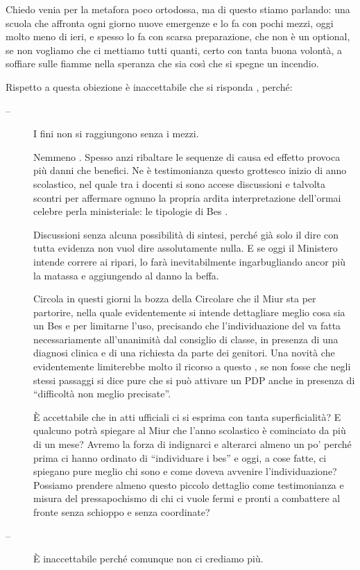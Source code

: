 Chiedo venia per la metafora poco ortodossa, ma di questo stiamo parlando: una scuola che affronta ogni giorno nuove emergenze e lo fa con pochi mezzi, oggi molto meno di ieri, e spesso lo fa con scarsa preparazione, che non è un optional, se non vogliamo che ci mettiamo tutti quanti, certo con tanta buona volontà, a soffiare sulle fiamme nella speranza che sia così che si spegne un incendio.

Rispetto a questa obiezione è inaccettabile che si risponda , perché:
\begin{description}
	\item[--]  I fini non si raggiungono senza i mezzi.
	
	 Nemmeno . Spesso anzi ribaltare le sequenze di causa ed effetto provoca più danni che benefici. Ne è testimonianza questo grottesco inizio di anno scolastico, nel quale tra i docenti si sono accese discussioni e talvolta scontri per affermare ognuno la propria ardita interpretazione dell'ormai celebre perla ministeriale: le tipologie di Bes .
	 
	 Discussioni senza alcuna possibilità di sintesi, perché già solo il dire  con tutta evidenza non vuol dire assolutamente nulla. E se oggi il Ministero intende correre ai ripari, lo farà inevitabilmente ingarbugliando ancor più la matassa e aggiungendo al danno la beffa.
	 
	 Circola in questi giorni la bozza della Circolare che il Miur sta per partorire, nella quale evidentemente si intende dettagliare meglio cosa sia un Bes e per limitarne l'uso, precisando che l'individuazione del  va fatta necessariamente all'unanimità dal consiglio di classe, in presenza di una diagnosi clinica e di una richiesta da parte dei genitori. Una novità che evidentemente limiterebbe molto il ricorso a questo , se non fosse che negli stessi passaggi si dice pure che si può attivare un PDP anche in presenza di “difficoltà non meglio precisate”.
	 
	 È accettabile che in atti ufficiali ci si esprima con tanta superficialità? E qualcuno potrà spiegare al Miur che l'anno scolastico è cominciato da più di un mese? Avremo la forza di indignarci e alterarci almeno un po' perché prima ci hanno ordinato di “individuare i bes” e oggi, a cose fatte, ci spiegano pure meglio chi sono e come doveva avvenire l'individuazione? Possiamo prendere almeno questo piccolo dettaglio come testimonianza e misura del pressapochismo di chi ci vuole fermi e pronti a combattere al fronte senza schioppo e senza coordinate?
	 \item [--] È inaccettabile perché comunque non ci crediamo più.
	 

\end{description}
